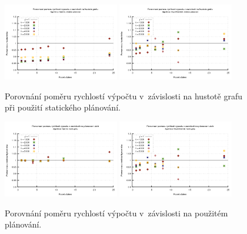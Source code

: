 \begin{figure}
    \centering
    \includegraphics[width=0.45\textwidth]{../grafy/02_openMP/02-04-Dijkstra_hustota_v1}
    \includegraphics[width=0.45\textwidth]{../grafy/02_openMP/02-04-Floyd_hustota_v1}
    \caption{Porovnání poměru rychlostí výpočtu v~závislosti na hustotě grafu při použití statického plánování.}
    \label{f:mer:pomerhustota}
\end{figure}

\begin{figure}
    \centering
    \includegraphics[width=0.45\textwidth]{../grafy/02_openMP/02-05-Dijkstra_schedule_v1}
    \includegraphics[width=0.45\textwidth]{../grafy/02_openMP/02-05-Floyd_schedule_v1}
    \caption{Porovnání poměru rychlostí výpočtu v~závislosti na použitém plánování.}
    \label{f:mer:pomerplanovani}
\end{figure}

